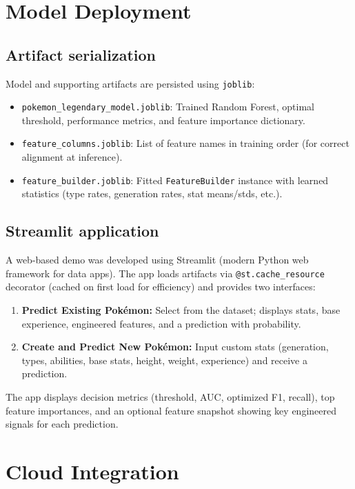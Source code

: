 \section{Model Deployment}
\label{sec:deployment}

\subsection{Artifact serialization}

Model and supporting artifacts are persisted using \texttt{joblib}:
\begin{itemize}
  \item \texttt{pokemon\_legendary\_model.joblib}: Trained Random Forest, optimal threshold, performance metrics, and feature importance dictionary.
  \item \texttt{feature\_columns.joblib}: List of feature names in training order (for correct alignment at inference).
  \item \texttt{feature\_builder.joblib}: Fitted \texttt{FeatureBuilder} instance with learned statistics (type rates, generation rates, stat means/stds, etc.).
\end{itemize}

\subsection{Streamlit application}

A web-based demo was developed using Streamlit (modern Python web framework for data apps). The app loads artifacts via \texttt{@st.cache\_resource} decorator (cached on first load for efficiency) and provides two interfaces:
\begin{enumerate}
  \item \textbf{Predict Existing Pokémon:} Select from the dataset; displays stats, base experience, engineered features, and a prediction with probability.
  \item \textbf{Create and Predict New Pokémon:} Input custom stats (generation, types, abilities, base stats, height, weight, experience) and receive a prediction.
\end{enumerate}

The app displays decision metrics (threshold, AUC, optimized F1, recall), top feature importances, and an optional feature snapshot showing key engineered signals for each prediction.

\section{Cloud Integration}
\label{sec:cloud_integration}

